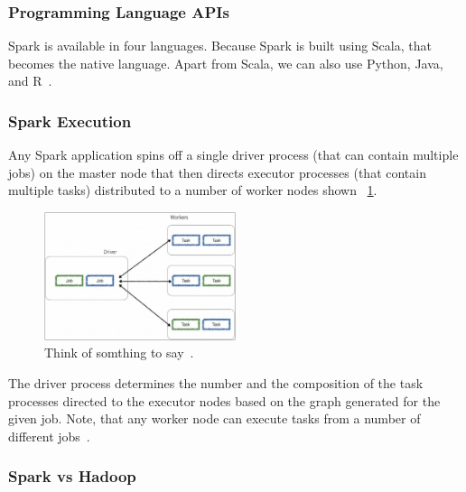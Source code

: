 \documentclass[]{final_report}
\begin{document}
\subsubsection{Programming Language APIs}

Spark is available in four languages. Because Spark is built using Scala, that becomes the native language. Apart from Scala, we can also use Python, Java, and R~\cite{singh_manage_2022}.

\subsubsection{Spark Execution}

Any Spark application spins off a single driver process (that can contain multiple jobs) on the master node that then directs executor processes (that contain multiple tasks) distributed to a number of worker nodes shown ~\ref{fig:Execute.png}.

\begin{figure}[ht]
    \centering
    \includegraphics[width=0.5\textwidth]{Execute.png}
    \caption{\label{fig:Execute.png}Think of somthing to say~\cite{drabas_learning_2017}.}
\end{figure}


The driver process determines the number and the composition of the task processes directed to the executor nodes based on the graph generated for the given job. Note, that any worker node can execute tasks from a number of different jobs~\cite{drabas_learning_2017}.

\subsubsection{Spark vs Hadoop}
\end{document}
